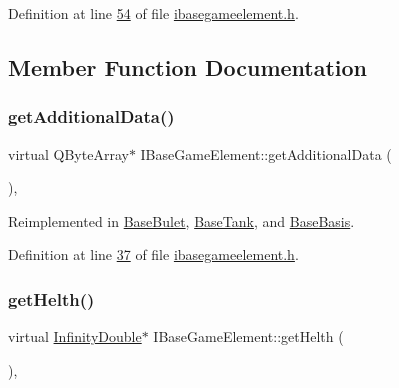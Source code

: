 Definition at line \hyperlink{a00047_source_l00054}{54} of file \hyperlink{a00047_source}{ibasegameelement.\+h}.



\subsection{Member Function Documentation}
\mbox{\label{a00137_aaf3cdf5f4e893704c9f17c524a1f0a8c}} 
\subsubsection{\texorpdfstring{get\+Additional\+Data()}{getAdditionalData()}}
{\footnotesize\ttfamily virtual Q\+Byte\+Array$\ast$ I\+Base\+Game\+Element\+::get\+Additional\+Data (\begin{DoxyParamCaption}{ }\end{DoxyParamCaption})\hspace{0.3cm}{\ttfamily [inline]}, {\ttfamily [virtual]}}



Reimplemented in \hyperlink{a00153_a307a62b59328f9e2a0530f559aba0dcb}{Base\+Bulet}, \hyperlink{a00157_aeecdd72e10d3996ee6c72c59f8bf69d8}{Base\+Tank}, and \hyperlink{a00149_aaf8b691c26fbbda7878c22dfda32ebe4}{Base\+Basis}.



Definition at line \hyperlink{a00047_source_l00037}{37} of file \hyperlink{a00047_source}{ibasegameelement.\+h}.

\mbox{\label{a00137_a13a00e39ece3e20e3f5e049224da8d40}} 
\subsubsection{\texorpdfstring{get\+Helth()}{getHelth()}}
{\footnotesize\ttfamily virtual \hyperlink{a00161}{Infinity\+Double}$\ast$ I\+Base\+Game\+Element\+::get\+Helth (\begin{DoxyParamCaption}{ }\end{DoxyParamCaption})\hspace{0.3cm}{\ttfamily [inline]}, {\ttfamily [virtual]}}



